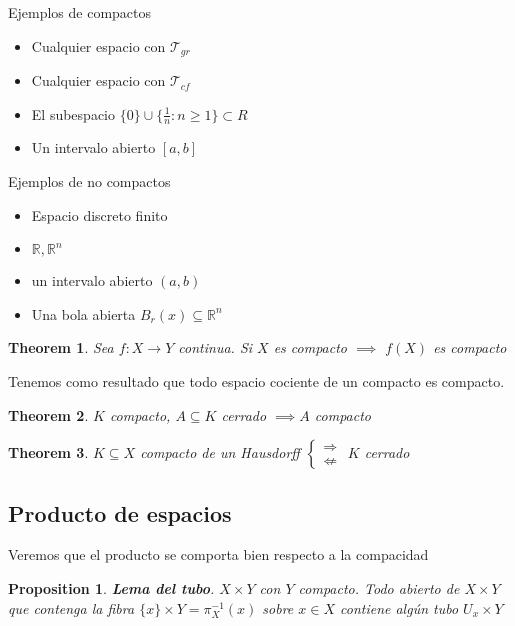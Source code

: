 \documentclass{myclass}
\newtheorem*{theorem}{Theorem}
\newtheorem*{proposition}{Proposition}
\begin{document}
\begin{minipage}{0.5\textwidth}
Ejemplos de compactos
\begin{itemize}[topsep=-6pt, itemsep=0pt]
  \item Cualquier espacio con $\mathcal{T}_{gr}$
  \item Cualquier espacio con $\mathcal{T}_{cf}$ 
  \item El subespacio $\{0\}\cup \{\frac{1}{n}:n\ge 1\}\subset R$
  \item Un intervalo abierto $[a, b]$
\end{itemize}
\end{minipage}
\begin{minipage}{0.5\textwidth}
Ejemplos de no compactos
\begin{itemize}[topsep=-6pt, itemsep=0pt]
  \item Espacio discreto finito
  \item $\mathbb{R}, \mathbb{R}^n$
  \item un intervalo abierto $(a, b)$
  \item Una bola abierta  $B_{r}(x)\subseteq \mathbb{R}^n$
\end{itemize}
\end{minipage}

\begin{theorem}
Sea $f:X\to Y$ continua. Si $X$ es compacto  $\implies$ $f(X)$ es compacto
\end{theorem}
Tenemos como resultado que todo espacio cociente de un compacto es compacto.

\begin{theorem}
$K$ compacto, $A\subseteq K$ cerrado $\implies A$ compacto
\end{theorem}

\begin{theorem}
$K\subseteq X$ compacto de un Hausdorff $\begin{cases}
  \Rightarrow \\
  \not\Leftarrow
\end{cases}$ 
$K$ cerrado
\end{theorem}

\subsection{Producto de espacios}
Veremos que el producto se comporta bien respecto a la compacidad

\begin{proposition}
\textbf{Lema del tubo}. $X\times Y$ con $Y$ compacto. Todo abierto de $X\times Y$ que contenga la fibra $\{x\}\times Y = \pi_X^{-1}(x)$ sobre $x\in X$ contiene algún tubo $U_x\times Y$
\end{proposition}
\end{document}
